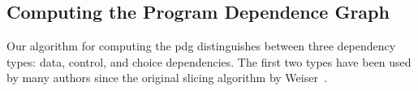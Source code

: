 %
%
%
%
%
%

\subsection{Computing the Program Dependence Graph}

Our algorithm for computing the \ac{pdg} distinguishes between three dependency types: data, control, and choice dependencies.
The first two types have been used by many authors since the original slicing algorithm by Weiser~\cite{weiser81:program_slicing}.

